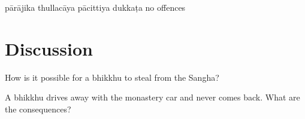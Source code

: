 \begin{exam}{\autoExamName}
\begin{problem*}
\begin{parts}
  \bigskip

  \begin{answers}{5}
    \bChoices
     pārājika\eAns
     thullacāya\eAns
     pācittiya\eAns
     dukkaṭa\eAns
     no offences\eAns
    \eChoices
  \end{answers}

\end{parts}

\end{problem*}

\section*{Discussion}

How is it possible for a bhikkhu to steal from the Sangha?

\bigskip

A bhikkhu drives away with the monastery car and never comes back.
What are the consequences?

\end{exam}
